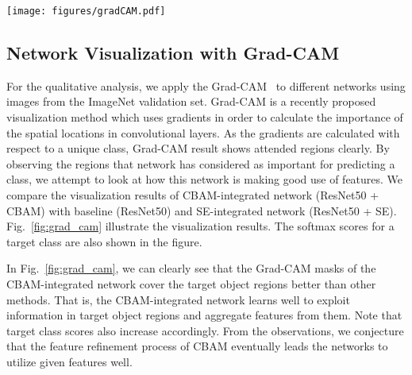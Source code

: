 \documentclass[runningheads]{llncs}
\newcommand{\figref}[1]{Fig.~\ref{#1}}
\begin{document}
\begin{figure*}
  \centering
  \texttt{[image: figures/gradCAM.pdf]}
  \caption{\textbf{Grad-CAM~\cite{selvaraju2017grad} visualization results.} We compare the visualization results of CBAM-integrated network (ResNet50 + CBAM) with baseline (ResNet50) and SE-integrated network (ResNet50 + SE). The grad-CAM visualization is calculated for the last convolutional outputs. The ground-truth label is shown on the top of each input image and \textit{P} denotes the softmax score of each network for the ground-truth class.}
  \label{fig:grad_cam}
\end{figure*}


\subsection{Network Visualization with Grad-CAM~\cite{selvaraju2017grad}}

For the qualitative analysis, we apply the Grad-CAM~\cite{selvaraju2017grad} to different networks using images from the ImageNet validation set. Grad-CAM is a recently proposed visualization method which uses gradients in order to calculate the importance of the spatial locations in convolutional layers. As the gradients are calculated with respect to a unique class, Grad-CAM result shows attended regions clearly. By observing the regions that network has considered as important for predicting a class, we attempt to look at how this network is making good use of features. We compare the visualization results of CBAM-integrated network (ResNet50 + CBAM) with baseline (ResNet50) and SE-integrated network (ResNet50 + SE). \figref{fig:grad_cam} illustrate the visualization results. The softmax scores for a target class are also shown in the figure. 

In \figref{fig:grad_cam}, we can clearly see that the Grad-CAM masks of the CBAM-integrated network cover the target object regions better than other methods. That is, the CBAM-integrated network learns well to exploit information in target object regions and aggregate features from them. Note that target class scores also increase accordingly. From the observations, we conjecture that the feature refinement process of CBAM eventually leads the networks to utilize given features well.



\end{document}
